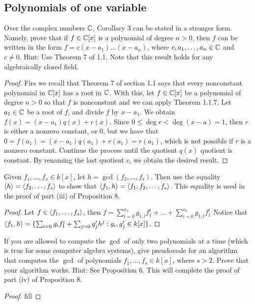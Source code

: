 \subsection{Polynomials of one variable}


\begin{exercise}{1}
Over the complex numbers $\mathbb{C}$, Corollary 3 can be stated in a stronger form. Namely, prove that if $f\in\mathbb{C}[x]$ is a polynomial of degree $n>0$, then $f$ can be written in the form $f=c(x-a_1)\dots(x-a_n)$, where $c,a_1,\dots,a_n\in\mathbb{C}$ and $c\neq 0$. Hint: Use Theorem 7 of 1.1. Note that this result holds for any algebraically closed field.
\end{exercise}
\begin{proof}
Firs we recall that Theorem 7 of section 1.1 says that every nonconstant polynomial in $\mathbb{C}[x]$ has a root in $\mathbb{C}$. With this, let $f\in\mathbb{C}[x]$ be a polynomial of degree $n>0$ so that $f$ is nonconstant and we can apply Theorem 1.1.7. Let $a_1\in\mathbb{C}$ be a root of $f$, and divide $f$ by $x-a_1$. We obtain $f(x)=(x-a_1)q(x)+r(x)$. Since $0\leq\deg r<\deg (x-a)=1$, then $r$ is either a nonzero constant, or 0, but we have that $0 =f(a_1) =(x-a_1)q(a_1)+r(a_1) =r(a_1)$, which is not possible if $r$ is a nonzero constant. Continue the process until the quotient $q(x)$ quotient is constant. By renaming the last quotient $c$, we obtain the desired result.
\end{proof}

\begin{exercise}{6}
Given $f_1,\dots,f_x\in k[x]$, let $h=\gcd(f_2,\dots,f_s)$. Then use the equality $\langle h\rangle=\langle f_2,\dots,f_s\rangle$ to show that $\langle f_1,h\rangle=\langle f_1,f_2,\dots,f_s\rangle$. This equality is used in the proof of part (iii) of Proposition 8.
\end{exercise}
\begin{proof}
Let $f\in\langle f_1,\dots,f_s\rangle$, then $f=\sum_{i=0}^{n_1}g_{1,i}f_1^i+\dots+\sum_{i=0}^{n_1}g_{1,i}f_1^i$
Notice that $\langle f_1,h\rangle=\{\sum_{i=0}g_if_1^i+\sum_{j=0}g_j'h^j: g_i,g_j'\in k[x]\}$, 
\end{proof}

\begin{exercise}{7}
If you are allowed to compute the $\gcd$ of only two polynomials at a time (which is true for some computer algebra systems), give pseudocode for an algorithm that computes the $\gcd$ of polynomials $f_1,\dots,f_s\in k[x]$, where $s>2$. Prove that your algorithm works. Hint: See Proposition 6. This will complete the proof of part (iv) of Proposition 8.
\end{exercise}
\begin{proof}
fill
\end{proof}

